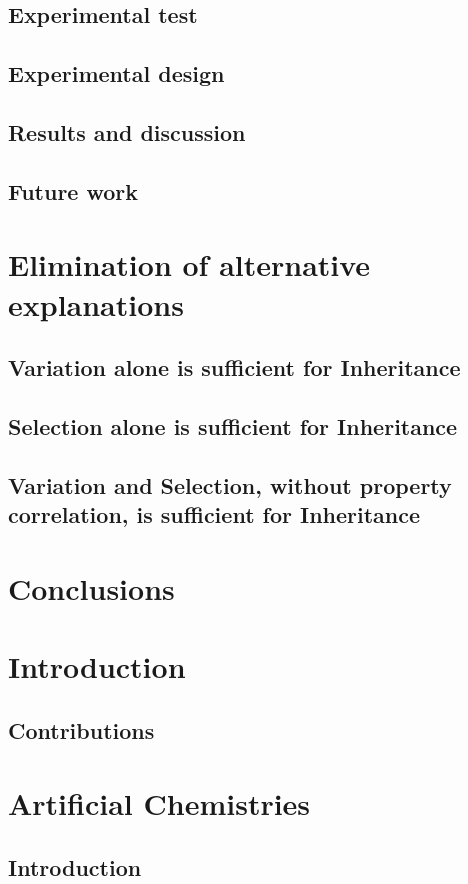 \documentclass[]{report}
\begin{document}
\section{Experimental test}
\section{Experimental design}
\section{Results and discussion}
\section{Future work}

\chapter{Elimination of alternative explanations}
\section{Variation alone is sufficient for Inheritance}
\section{Selection alone is sufficient for Inheritance}
\section{Variation and Selection, without property correlation, is sufficient for Inheritance}

\chapter{Conclusions}

\chapter{Introduction}
\section{Contributions}

\chapter{Artificial Chemistries}
\section{Introduction}
\end{document}
